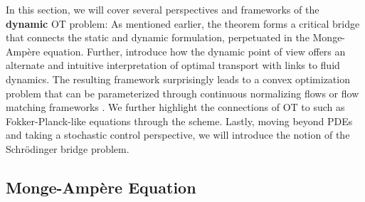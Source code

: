 In this section, we will cover several perspectives and frameworks of the \textbf{dynamic} \acrshort{OT} problem: As mentioned earlier, the \citeauthor{brenier1987decomposition} theorem  forms a critical bridge that connects the static and dynamic formulation, perpetuated in the Monge-Amp{\`e}re equation.
Further, \citet*{benamou2000computational} introduce how the dynamic point of view offers an alternate and intuitive interpretation of optimal transport with links to fluid dynamics. The resulting framework surprisingly leads to a convex optimization problem that can be parameterized through continuous normalizing flows \citep{tong2020trajectorynet, chen2018neural} or flow matching frameworks \citep{lipman2023flow, liu2022flow, pooladian2023multisample, albergo2023stochastic}.
We further highlight the connections of \acrshort{OT} to  such as Fokker-Planck-like equations through the \citeauthor*{jordan1998variational} scheme.
Lastly, moving beyond PDEs and taking a stochastic control perspective, we will introduce the notion of the Schr\"odinger bridge problem.


\subsection{Monge-Amp{\`e}re Equation} \label{sec:background_monge_ampere}


